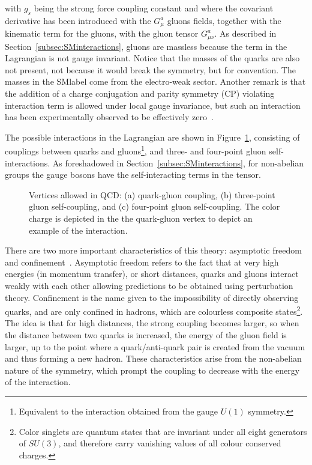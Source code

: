 with $g_s$ being the strong force coupling constant and where the covariant derivative has been introduced
with the $G_\mu^a$ gluons fields, together with the kinematic term for the gluons, with the gluon tensor $G_{\mu\nu}^a$.
As described in Section~\ref{subsec:SMinteractions}, gluons are massless because the term in the Lagrangian is not gauge invariant.
Notice that the masses of the quarks are also not present, not because it would break the symmetry, but for convention.
The masses in the \acrshort{SMlabel} come from the electro-weak sector.
Another remark is that the addition of a charge conjugation and parity symmetry (CP)
violating interaction term is allowed under local gauge invariance, but such an interaction has been experimentally observed
to be effectively zero~\cite{PhysRevLett.124.081803}.

The possible interactions in the Lagrangian are shown in Figure~\ref{figSM:QCDfey}, consisting of couplings between quarks and gluons\footnote{Equivalent to the interaction obtained from the gauge $U(1)$ symmetry.}, and three- and four-point gluon self-interactions. As foreshadowed in Section~\ref{subsec:SMinteractions}, for non-abelian groups the gauge bosons have the self-interacting terms in the tensor.

\begin{figure}[htbp]
    \RawFloats
    \begin{center}
    \quad
    \quad
    \caption{Vertices allowed in QCD: (a) quark-gluon coupling, (b) three-point gluon self-coupling, and (c) four-point gluon self-coupling. The color charge is depicted in the the quark-gluon vertex to depict an example of the interaction.}
    \label{figSM:QCDfey}
    \end{center}
\end{figure}

There are two more important characteristics of this theory:
asymptotic freedom and confinement~\cite{PhysRevLett.30.1346,PhysRevLett.30.1343}. Asymptotic freedom refers to the fact that at very high energies (in momentum transfer), or short distances, quarks and gluons interact weakly with each other allowing predictions to be obtained using perturbation theory. Confinement is the name given to the impossibility of directly observing quarks, and are only confined in hadrons, which are colourless composite states\footnote{Color singlets are quantum states that are invariant under all eight generators of $SU(3)$, and therefore carry vanishing values of all colour conserved charges.}.
The idea is that for high distances, the strong coupling becomes larger, so when the distance between two quarks is increased, the energy of the gluon field is larger, up to the point where a quark/anti-quark pair is created from the vacuum and thus forming a new hadron. These characteristics arise from the non-abelian nature of the symmetry, which prompt the coupling to decrease with the energy of the interaction.

